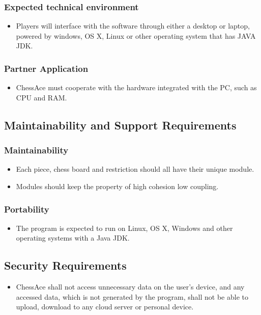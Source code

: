 \documentclass[12pt, titlepage]{article}
\begin{document}
\subsubsection{Expected technical environment}
\begin{itemize}
\item Players will interface with the software through either a desktop or laptop, powered by windows, OS X, Linux or other operating system that has JAVA JDK.
\end{itemize}
\subsubsection{Partner Application}
\begin{itemize}
\item ChessAce must cooperate with the hardware integrated with the PC, such as CPU and RAM.
\end{itemize}
\subsection{Maintainability and Support Requirements}
\subsubsection{Maintainability}
\begin{itemize}
\item Each piece, chess board and restriction should all have their unique module.
\item Modules should keep the property of high cohesion low coupling.
\end{itemize}
\subsubsection{Portability}
\begin{itemize}
\item The program is expected to run on Linux, OS X, Windows and other operating systems with a Java JDK.
\end{itemize}
\subsection{Security Requirements}
\begin{itemize}
\item ChessAce shall not access unnecessary data on the user's device, and any accessed data, which is not generated by the program, shall not be able to upload, download to any cloud server or personal device.
\end{itemize}
\end{document}
